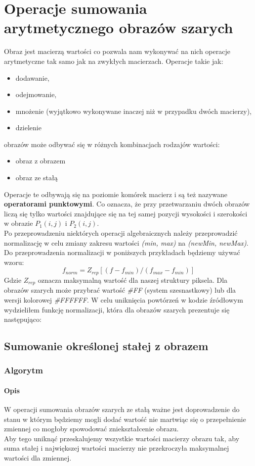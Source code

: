 \documentclass[a4paper,12pt]{book}
\begin{document}
\chapter{Operacje sumowania arytmetycznego obrazów szarych}
Obraz jest macierzą wartości co pozwala nam wykonywać na nich operacje arytmetyczne tak samo jak na zwykłych macierzach. 
Operacje takie jak: 
\renewcommand{\labelitemi}{$*$}
\begin{itemize}
	\item dodawanie,
	\item odejmowanie,
	\item mnożenie (wyjątkowo wykonywane inaczej niż w przypadku dwóch macierzy),
	\item dzielenie
\end{itemize}
obrazów może odbywać się w różnych kombinacjach rodzajów wartości: 
\renewcommand{\labelitemi}{$*$}
\begin{itemize}
	\item obraz z obrazem
	\item obraz ze stałą
\end{itemize}
Operacje te odbywają się na poziomie komórek macierz i są też nazywane \textbf{operatorami punktowymi}. Co oznacza, że przy przetwarzaniu dwóch obrazów liczą się tylko wartości znajdujące się na tej samej pozycji wysokości i szerokości w obrazie $P_1(i,j)$ i $P_2(i,j)$. 
\\
Po przeprowadzeniu niektórych operacji algebraicznych należy przeprowadzić normalizację w celu zmiany zakresu wartości \textit{(min, max)} na \textit{(newMin, newMax)}. 
Do przeprowadzenia normalizacji w poniższych przykładach będziemy używać wzoru: 
\[f_{norm}=Z_{rep}[(f-f_{min})/(f_{max}-f_{min})]\]
Gdzie $Z_{rep}$ oznacza maksymalną wartość dla naszej struktury piksela. Dla obrazów szarych może przybrać wartość \textit{\#FF} (system szesnastkowy) lub dla wersji kolorowej \textit{\#FFFFFF}. 
W celu uniknięcia powtórzeń w kodzie źródłowym wydzieliłem funkcję normalizacji, która dla obrazów szarych prezentuje się następująco: 

\section{Sumowanie określonej stałej z obrazem}
\subsection*{Algorytm}
\subsubsection*{Opis}
W operacji sumowania obrazów szarych ze stałą ważne jest doprowadzenie do stanu w którym będziemy mogli dodać wartość 
nie martwiąc się o przepełnienie zmiennej co mogłoby spowodować zniekształcenie obrazu. \\
Aby tego uniknąć przeskalujemy wszystkie wartości macierzy obrazu tak, aby suma stałej i największej wartości macierzy 
nie przekroczyła maksymalnej wartości dla zmiennej. 
\end{document}
